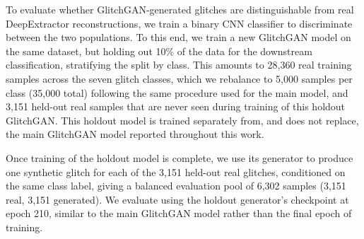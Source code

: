 \documentclass[reprint,nofootinbib,amsmath,amssymb,aps,floatfix]{revtex4-2}
\begin{document}

To evaluate whether GlitchGAN-generated glitches are distinguishable from real DeepExtractor reconstructions, we train a binary CNN classifier to discriminate between the two populations. 
To this end, we train a new GlitchGAN model on the same dataset, but holding out 10\% of the data for the downstream classification, stratifying the split by class. 
This amounts to 28{,}360 real training samples across the seven glitch classes, which we rebalance to 5{,}000 samples per class (35{,}000 total) following the same procedure used for the main model, and 3{,}151 held-out real samples that are never seen during training of this holdout GlitchGAN. 
This holdout model is trained separately from, and does not replace, the main GlitchGAN model reported throughout this work.

Once training of the holdout model is complete, we use its generator to produce one synthetic glitch for each of the 3{,}151 held-out real glitches, conditioned on the same class label, giving a balanced evaluation pool of 6{,}302 samples (3{,}151 real, 3{,}151 generated). 
We evaluate using the holdout generator's checkpoint at epoch 210, similar to the main GlitchGAN model rather than the final epoch of training.
\end{document}

